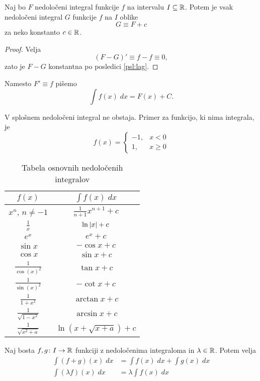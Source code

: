 \documentclass[12pt, a4paper]{article}
\begin{document}
\begin{trditev}
Naj bo $F$ nedoločeni integral funkcije $f$ na intervalu $I\subseteq\mathbb{R}$. Potem je vsak nedoločeni integral $G$ funkcije $f$ na $I$ oblike
\[
G\equiv F+c
\]
za neko konstanto $c\in\mathbb{R}$.
\end{trditev}

\begin{proof}
Velja
\[
(F-G)'\equiv f-f\equiv 0,
\]
zato je $F-G$ konstantna po posledici \ref{psl:lag}.
\end{proof}

Namesto $F'\equiv f$ pišemo
\[
\int f(x)\;dx=F(x)+C.
\]

\begin{opomba}
V splošnem nedoločeni integral ne obstaja. Primer za funkcijo, ki nima integrala, je
\[
f(x)=\begin{cases}
-1, & x < 0
\\
1,  & x \geq 0
\end{cases}
\]
\end{opomba}

\begin{table}[!ht]
\centering
\caption{Tabela osnovnih nedoločenih integralov}
\begin{tabular}{c|c}
$f(x)$                   & $\displaystyle\int f(x)\;dx$ \\ \hline
$x^n$, $n\ne -1$         & $\frac{1}{n+1}x^{n+1}+c$     \\
$\frac{1}{x}$            & $\ln\left\lvert x\right\rvert+c$               \\
$e^x$                    & $e^x+c$                      \\
$\sin x$                 & $-\cos x+c$                  \\
$\cos x$                 & $\sin x + c$                 \\
$\frac{1}{\cos(x)^2}$    & $\tan x+c$                   \\
$\frac{1}{\sin(x)^2}$    & $-\cot x+c$                  \\
$\frac{1}{1+x^2}$        & $\arctan x+c$                \\
$\frac{1}{\sqrt{1-x^2}}$ & $\arcsin x+c$                \\
$\frac{1}{\sqrt{x^2+a}}$ & $\ln(x+\sqrt{x+a})+c$
\end{tabular}
\end{table}

\begin{trditev}
Naj bosta $f,g\colon I\to\mathbb{R}$ funkciji z nedoločenima integraloma in $\lambda\in\mathbb{R}$. Potem velja
\begin{align*}
\int(f+g)(x)\;dx &= \int f(x)\;dx+\int g(x)\;dx
\\
\int (\lambda f)(x)\;dx &= \lambda\int f(x)\;dx
\end{align*}
\end{trditev}
\end{document}
